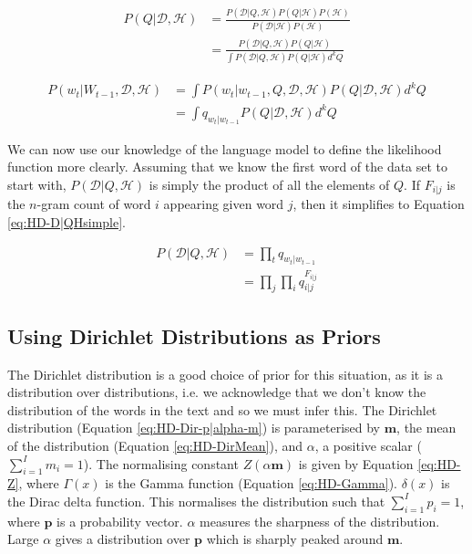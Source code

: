 \begin{align}
P(Q|\mathcal{D},\mathscr{H})&=\frac{P(\mathcal{D}|Q,\mathscr{H})P(Q|\mathscr{H})P(\mathscr{H})}{P(\mathcal{D}|\mathscr{H})P(\mathscr{H})} \nonumber
\\
&=\frac{P(\mathcal{D}|Q,\mathscr{H})P(Q|\mathscr{H})}{\int P(\mathcal{D}|Q,\mathscr{H})P(Q|\mathscr{H})d^{k}Q}
\label{eq:HD-Q|DH}
\end{align}

\begin{align}
P(w_{t}|W_{t-1},\mathcal{D},\mathscr{H})&=\int P(w_{t}|w_{t-1},Q,\mathcal{D},\mathscr{H})P(Q|\mathcal{D},\mathscr{H})d^{k}Q \nonumber
\\
&=\int q_{w_{t}|w_{t-1}}P(Q|\mathcal{D},\mathscr{H})d^{k}Q
\label{eq:HD-wt|wt-1DH}
\end{align}

We can now use our knowledge of the language model to define the likelihood function more clearly. Assuming that we know the first word of the data set to start with, $P(\mathcal{D}|Q,\mathscr{H})$ is simply the product of all the elements of $Q$. If $F_{i|j}$ is the $n$-gram count of word $i$ appearing given word $j$, then it simplifies to Equation \ref{eq:HD-D|QHsimple}.

\begin{align}
P(\mathcal{D}|Q,\mathscr{H})&=\prod_{t}q_{w_{t}|w_{t-1}} \nonumber
\\
&=\prod_{j}\prod_{i}q_{i|j}^{F_{i|j}}
\label{eq:HD-D|QHsimple}
\end{align}

\subsection{Using Dirichlet Distributions as Priors}

The Dirichlet distribution is a good choice of prior for this situation, as it is a distribution over distributions, i.e. we acknowledge that we don't know the distribution of the words in the text and so we must infer this. The Dirichlet distribution (Equation \ref{eq:HD-Dir-p|alpha-m}) is parameterised by $\boldsymbol{m}$, the mean of the distribution (Equation \ref{eq:HD-DirMean}), and $\alpha$, a positive scalar ($\sum_{i=1}^{I}m_{i}=1$). The normalising constant $Z(\alpha\boldsymbol{m})$ is given by Equation \ref{eq:HD-Z}, where $\Gamma(x)$ is the Gamma function (Equation \ref{eq:HD-Gamma}). $\delta(x)$ is the Dirac delta function. This normalises the distribution such that $\sum_{i=1}^{I}p_{i}=1$, where $\boldsymbol{p}$ is a probability vector. $\alpha$ measures the sharpness of the distribution. Large $\alpha$ gives a distribution over $\boldsymbol{p}$ which is sharply peaked around $\boldsymbol{m}$.

